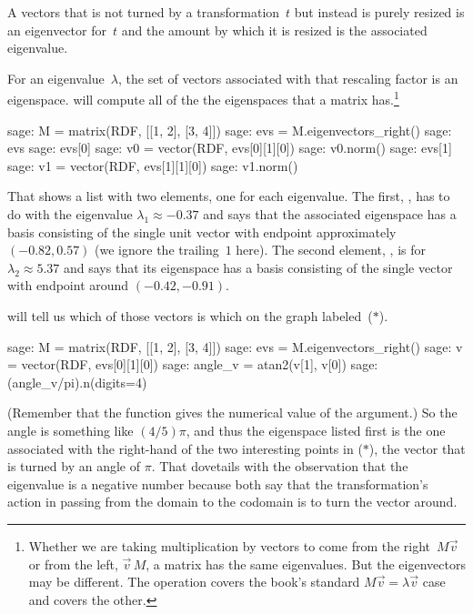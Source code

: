 A vectors that is not turned by a transformation~$t$ but instead
is purely resized 
is an eigenvector for~$t$ and the amount by which it is 
resized is the associated eigenvalue.

For an eigenvalue~$\lambda$, the set of vectors associated with
that rescaling factor is an eigenspace.
\Sage{} will compute all of the the eigenspaces that a matrix has.\footnote{%
  Whether we are taking multiplication 
  by vectors to come from the 
  right~$M\vec{v}$ or from the left, $\vec{v}\,M$, 
  a matrix has the same eigenvalues.  
  But the eigenvectors may be different. 
  The \protect\Sage{} operation \protect{} 
  covers the book's standard
  $M\vec{v}=\lambda\vec{v}$ case and  
  \protect{}
  covers the other.}

\begin{sagecommandline}
sage: M = matrix(RDF, [[1, 2], [3, 4]])
sage: evs = M.eigenvectors_right()
sage: evs
sage: evs[0] 
sage: v0 = vector(RDF, evs[0][1][0])
sage: v0.norm()
sage: evs[1]
sage: v1 = vector(RDF, evs[1][1][0])
sage: v1.norm()
\end{sagecommandline}
That shows a list with two elements, one for each eigenvalue.
The first, , 
has to do with the eigenvalue $\lambda_1\approx -0.37$ and
says that the associated eigenspace has a basis consisting of the single unit
vector with endpoint approximately $(-0.82, 0.57)$
(we ignore the trailing~$1$ here).
The second element, , 
is for~$\lambda_2\approx 5.37$
and says that its eigenspace
has a basis consisting of the single vector with endpoint around
$(-0.42, -0.91)$. 

\Sage{} will tell us which of those vectors is which on the graph 
labeled~($*$).
\begin{sagecommandline}
sage: M = matrix(RDF, [[1, 2], [3, 4]])
sage: evs = M.eigenvectors_right()
sage: v = vector(RDF, evs[0][1][0])
sage: angle_v = atan2(v[1], v[0]) 
sage: (angle_v/pi).n(digits=4) 
\end{sagecommandline}
(Remember that the  function gives the numerical value of
the argument.)
So the angle is something like $(4/5)\pi$, and thus
the eigenspace listed first is the one associated with the right-hand
of the two interesting points in ($*$), the vector that is turned by an angle
of $\pi$.
That dovetails with the observation that the eigenvalue is a negative number 
because both say that the transformation's action in passing from the
domain to the codomain is to turn the vector around.

